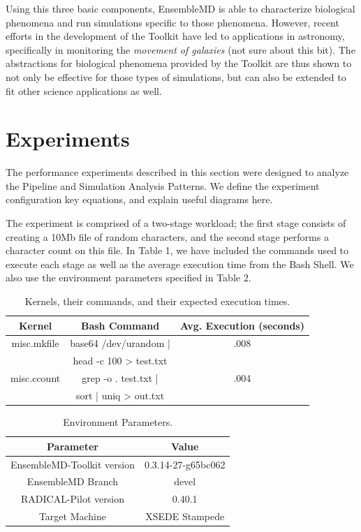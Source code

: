 \documentclass[]{article}
\begin{document}
			Using this three basic components, EnsembleMD is able to characterize biological phenomena and run simulations specific to those phenomena. However, recent efforts in the development of the Toolkit have led to applications in astronomy, specifically in monitoring the \textit{movement of galaxies} (not sure about this bit). The abstractions for biological phenomena provided by the Toolkit are thus shown to not only be effective for those types of simulations, but can also be extended to fit other science applications as well.

\section{Experiments}
		The performance experiments described in this section were designed to analyze the Pipeline and Simulation Analysis Patterns. We define the experiment configuration key equations, and explain useful diagrams here.

		The experiment is comprised of a two-stage workload; the first stage consists of creating a 10Mb file of random characters, and the second stage performs a character count on this file. In Table 1, we have included the commands used to execute each stage as well as the average execution time from the Bash Shell. We also use the environment parameters specified in Table 2.

		\begin{table}[H]
			\centering
			\begin{tabu}{|c|c|c|}
				\hline
				Kernel & Bash Command & Avg. Execution (seconds) \\
				\hline
				misc.mkfile & base64 /dev/urandom | & .008 \\ 
							& head -c 100 > test.txt  \\
				\hline
				misc.ccount & grep -o . test.txt |  & .004\\ 
							& sort | uniq > out.txt   \\
				\hline
			\end{tabu}
			\caption{Kernels, their commands, and their expected execution times.}
			\label{table:kernel_execution_table}
		\end{table}

		\begin{table}[H]
			\centering
			\begin{tabular}{|c|c|}
					\hline
					Parameter & Value \\
					\hline
					\hline
					EnsembleMD-Toolkit version & 0.3.14-27-g65bc062 \\
					\hline
					EnsembleMD Branch & devel \\
					\hline
					RADICAL-Pilot version & 0.40.1 \\
					\hline
					Target Machine & XSEDE Stampede \\
					\hline
			\end{tabular}
			\caption{Environment Parameters.}
			\label{table:environment_variables}
		\end{table}
\end{document}
